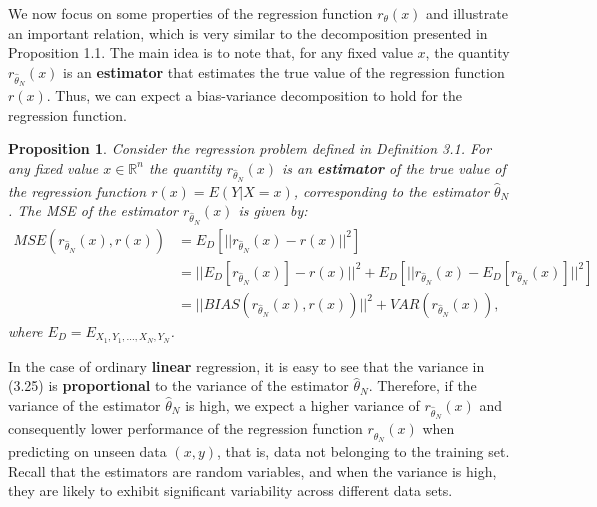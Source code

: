 \documentclass{report}
\newtheorem{proposition}{Proposition}[chapter]
\begin{document}
We now focus on some properties of the regression function $r_\theta(x)$ and illustrate an important relation, which is very similar to the decomposition presented in Proposition 1.1. The main idea is to note that, for any fixed value $x$, the quantity $r_{\hat{\theta}_N}(x)$ is an \textbf{estimator} that estimates the true value of the regression function $r(x)$. Thus, we can expect a bias-variance decomposition to hold for the regression function.

\begin{proposition}
Consider the regression problem defined in Definition 3.1. For any fixed value $x \in \mathbb{R}^n$ the quantity $r_{\hat{\theta}_N}(x)$ is an \textbf{estimator} of the true value of the regression function $r(x) = E(Y|X = x)$, corresponding to the estimator $\hat{\theta}_N$. The MSE of the estimator $r_{\hat{\theta}_N}(x)$ is given by:
\begin{equation}
\begin{split}
MSE(r_{\hat{\theta}_N}(x),r(x)) &= E_D[||r_{\hat{\theta}_N}(x) - r(x)||^2] \\
&=||E_D[r_{\hat{\theta}_N}(x)] - r(x)||^2+E_D[||r_{\hat{\theta}_N}(x) - E_D[r_{\hat{\theta}_N}(x)]||^2]\\
&=||BIAS(r_{\hat{\theta}_N}(x), r(x))||^2 + VAR(r_{\hat{\theta}_N}(x)),
\end{split}
\end{equation}
where $E_D = E_{X_1,Y_1,\dots,X_N,Y_N}$.
\end{proposition}

In the case of ordinary \textbf{linear} regression, it is easy to see that the variance in (3.25) is \textbf{proportional} to the variance of the estimator $\hat{\theta}_N$. Therefore, if the variance of the estimator $\hat{\theta}_N$ is high, we expect a higher variance of $r_{\hat{\theta}_N}(x)$ and consequently lower performance of the regression function $r_{\hat{\theta}_N}(x)$ when predicting on unseen data $(x, y)$, that is, data not belonging to the training set. Recall that the estimators are random variables, and when the variance is high, they are likely to exhibit significant variability across different data sets.
\end{document}
